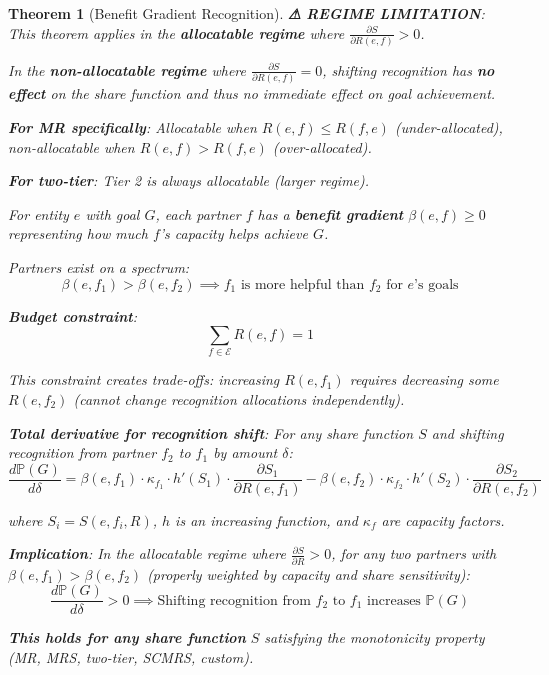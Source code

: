 \documentclass[11pt,a4paper]{article}
\newtheorem{theorem}{Theorem}[section]
\theoremstyle{definition}
\theoremstyle{remark}
\newcommand{\E}{\mathcal{E}}
\begin{document}
\begin{theorem}[Benefit Gradient Recognition]
\textbf{\color{red} ⚠ REGIME LIMITATION}: This theorem applies in the \textbf{allocatable regime} where $\frac{\partial S}{\partial R(e,f)} > 0$.

In the \textbf{non-allocatable regime} where $\frac{\partial S}{\partial R(e,f)} = 0$, shifting recognition has \textbf{no effect} on the share function and thus no immediate effect on goal achievement.

\textbf{For MR specifically}: Allocatable when $R(e,f) \le R(f,e)$ (under-allocated), non-allocatable when $R(e,f) > R(f,e)$ (over-allocated).

\textbf{For two-tier}: Tier 2 is always allocatable (larger regime).

\medskip

For entity $e$ with goal $G$, each partner $f$ has a \textbf{benefit gradient} $\beta(e,f) \ge 0$ representing how much $f$'s capacity helps achieve $G$.

Partners exist on a spectrum:
\[ \beta(e,f_1) > \beta(e,f_2) \implies f_1 \text{ is more helpful than } f_2 \text{ for } e\text{'s goals} \]

\textbf{Budget constraint}:
\[ \sum_{f \in \E} R(e,f) = 1 \]

This constraint creates trade-offs: increasing $R(e,f_1)$ requires decreasing some $R(e,f_2)$ (cannot change recognition allocations independently).

\textbf{Total derivative for recognition shift}: For any share function $S$ and shifting recognition from partner $f_2$ to $f_1$ by amount $\delta$:
\[ \frac{d\mathbb{P}(G)}{d\delta} = \beta(e,f_1) \cdot \kappa_{f_1} \cdot h'(S_1) \cdot \frac{\partial S_1}{\partial R(e,f_1)} - \beta(e,f_2) \cdot \kappa_{f_2} \cdot h'(S_2) \cdot \frac{\partial S_2}{\partial R(e,f_2)} \]

where $S_i = S(e,f_i,R)$, $h$ is an increasing function, and $\kappa_f$ are capacity factors.

\textbf{Implication}: In the allocatable regime where $\frac{\partial S}{\partial R} > 0$, for any two partners with $\beta(e,f_1) > \beta(e,f_2)$ (properly weighted by capacity and share sensitivity):
\[ \frac{d\mathbb{P}(G)}{d\delta} > 0 \implies \text{Shifting recognition from } f_2 \text{ to } f_1 \text{ increases } \mathbb{P}(G) \]

\textbf{This holds for any share function} $S$ satisfying the monotonicity property (MR, MRS, two-tier, SCMRS, custom).
\end{theorem}
\end{document}
